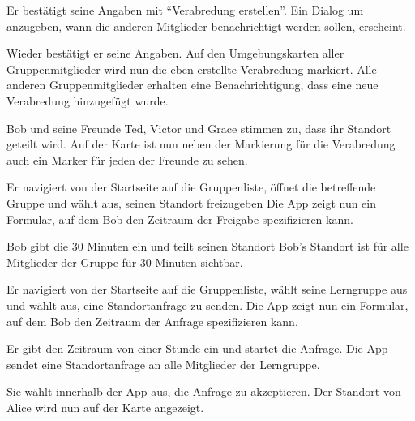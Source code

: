 \documentclass[parskip=full,11pt]{scrartcl}
\begin{document}
{Er bestätigt seine Angaben mit \enquote{Verabredung erstellen}.}
{Ein Dialog um anzugeben, wann die anderen Mitglieder benachrichtigt werden sollen, erscheint.}

{Wieder bestätigt er seine Angaben.}
{Auf den Umgebungskarten aller Gruppenmitglieder wird nun die eben erstellte Verabredung markiert.
Alle anderen Gruppenmitglieder erhalten eine Benachrichtigung,
dass eine neue Verabredung hinzugefügt wurde.}

{Bob und seine Freunde Ted, Victor und Grace stimmen zu, dass ihr Standort geteilt wird.}
{Auf der Karte ist nun neben der Markierung für die Verabredung auch ein Marker für
jeden der Freunde zu sehen.}


{Er navigiert von der Startseite auf die Gruppenliste, öffnet die betreffende Gruppe und wählt aus, seinen Standort freizugeben}
{Die App zeigt nun ein Formular, auf dem Bob den Zeitraum der Freigabe spezifizieren kann.}

{Bob gibt die 30 Minuten ein und teilt seinen Standort}
{Bob's Standort ist für alle Mitglieder der Gruppe für 30 Minuten sichtbar.}


{Er navigiert von der Startseite auf die Gruppenliste, wählt seine Lerngruppe aus und wählt aus, eine Standortanfrage zu senden.}
{Die App zeigt nun ein Formular, auf dem Bob den Zeitraum der Anfrage spezifizieren kann.}

{Er gibt den Zeitraum von einer Stunde ein und startet die Anfrage.}
{Die App sendet eine Standortanfrage an alle Mitglieder der Lerngruppe.}

{Sie wählt innerhalb der App aus, die Anfrage zu akzeptieren.}
{Der Standort von Alice wird nun auf der Karte angezeigt.}
\end{document}
